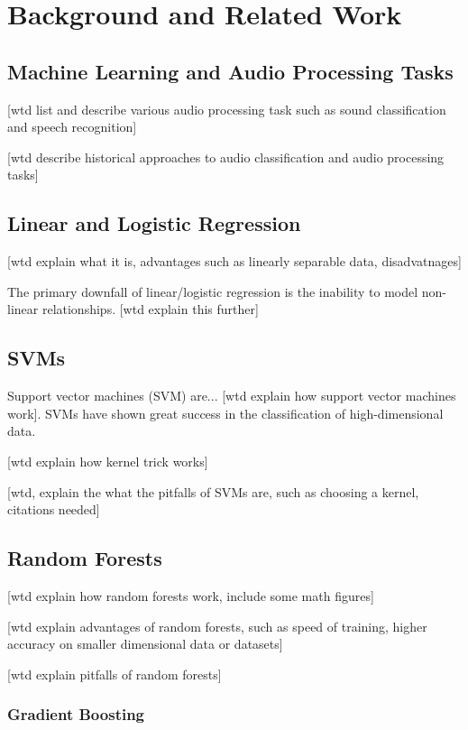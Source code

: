 \chapter{Background and Related Work}
\label{Background and Related Work}

\section{Machine Learning and Audio Processing Tasks}

[wtd list and describe various audio processing task such as sound classification and speech recognition]

[wtd describe historical approaches to audio classification and audio processing tasks]

\section{Linear and Logistic Regression}

[wtd explain what it is, advantages such as linearly separable data, disadvatnages]

The primary downfall of linear/logistic regression is the inability to model non-linear relationships. [wtd explain this further]

\section{SVMs}

Support vector machines (SVM) are... [wtd explain how support vector machines work].  SVMs have shown great success in the classification of high-dimensional data.

[wtd explain how kernel trick works]

[wtd, explain the what the pitfalls of SVMs are, such as choosing a kernel, citations needed]

\section{Random Forests}

[wtd explain how random forests work, include some math figures]

[wtd explain advantages of random forests, such as speed of training, higher accuracy on smaller dimensional data or datasets]

[wtd explain pitfalls of random forests]

\subsection{Gradient Boosting}

